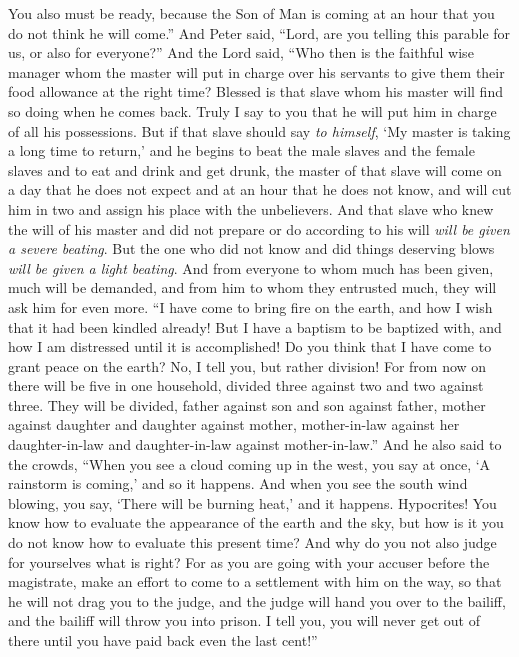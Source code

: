 \begin{biblechapter}
\verse You also must be ready, because the Son of Man is coming at an hour that you do not think he will come.”
 And Peter said, “Lord, are you telling this parable for us, or also for everyone?”
\verse And the Lord said, “Who then is the faithful wise manager whom the master will put in charge over his servants to give them their food allowance at the right time?
\verse Blessed is that slave whom his master will find so doing when he comes back.
\verse Truly I say to you that he will put him in charge of all his possessions.
\verse But if that slave should say \textit{to himself}, ‘My master is taking a long time to return,’ and he begins to beat the male slaves and the female slaves and to eat and drink and get drunk,
\verse the master of that slave will come on a day that he does not expect and at an hour that he does not know, and will cut him in two and assign his place with the unbelievers.
\verse And that slave who knew the will of his master and did not prepare or do according to his will \textit{will be given a severe beating}.
\verse But the one who did not know and did things deserving blows \textit{will be given a light beating}. And from everyone to whom much has been given, much will be demanded, and from him to whom they entrusted much, they will ask him for even more.
 “I have come to bring fire on the earth, and how I wish that it had been kindled already!
\verse But I have a baptism to be baptized with, and how I am distressed until it is accomplished!
\verse Do you think that I have come to grant peace on the earth? No, I tell you, but rather division!
\verse For from now on there will be five in one household, divided three against two and two against three.
\verse They will be divided, father against son and son against father, mother against daughter and daughter against mother, mother-in-law against her daughter-in-law and daughter-in-law against mother-in-law.”
 And he also said to the crowds, “When you see a cloud coming up in the west, you say at once, ‘A rainstorm is coming,’ and so it happens.
\verse And when you see the south wind blowing, you say, ‘There will be burning heat,’ and it happens.
\verse Hypocrites! You know how to evaluate the appearance of the earth and the sky, but how is it you do not know how to evaluate this present time?
 And why do you not also judge for yourselves what is right?
\verse For as you are going with your accuser before the magistrate, make an effort to come to a settlement with him on the way, so that he will not drag you to the judge, and the judge will hand you over to the bailiff, and the bailiff will throw you into prison.
\verse I tell you, you will never get out of there until you have paid back even the last cent!”
\end{biblechapter}

